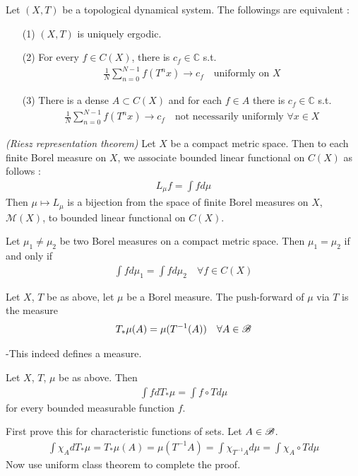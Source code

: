 \documentclass[10pt,a4paper]{report}
\newenvironment{proof}
{\begin{changemargin}{1cm}{0.5cm} 
	}%
	{\end{changemargin}
}
\begin{document}
\thm Let $(X,T)$ be a topological dynamical system. The followings are equivalent :
\begin{itemize}
\item[(1)] $(X,T)$ is uniquely ergodic.
\item[(2)] For every $f\in C(X)$, there is $c_f \in \mathbb{C}$ s.t. 
\begin{align*}
\frac{1}{N} \sum_{n=0}^{N-1} f(T^n x) \rightarrow c_f \quad \text{uniformly on } X
\end{align*}
\item[(3)]  There is a dense $A\subset C(X)$ and for each $f\in A$ there is $c_f \in \mathbb{C}$ s.t.
\begin{align*}
\frac{1}{N} \sum_{n=0}^{N-1} f(T^n x) \rightarrow c_f \quad \text{not necessarily uniformly } \forall x\in X
\end{align*}
\end{itemize}
\s

\thm \emph{(Riesz representation theorem)}  Let $X$ be a compact metric space. Then to each finite Borel measure on $X$, we associate bounded linear functional on $C(X)$ as follows : 
\begin{align*}
L_{\mu} f= \int f d\mu
\end{align*}
Then $\mu \mapsto L_{\mu}$ is a bijection from the space of finite Borel measures on $X$, $\mathscr{M}(X)$, to bounded linear functional on $C(X)$.
\s 

\cor Let $\mu_1 \neq \mu_2$ be two Borel measures on a compact metric space. Then $\mu_1 = \mu_2$ if and only if
\begin{align*}
\int f d\mu_1 = \int f d\mu_2 \quad \forall f \in C(X)
\end{align*}
\s

 Let $X$, $T$ be as above, let $\mu$ be a Borel measure. The push-forward of $\mu$ via $T$ is the measure
\begin{align*}
T_{*} \mu (A) = \mu(T^{-1}(A)) \quad \forall A\in \mathscr{B}
\end{align*}

-This indeed defines a measure.
\s

\lem Let $X$, $T$, $\mu$ be as above. Then
\begin{align*}
\int f dT_{*}\mu = \int f \circ T d\mu
\end{align*}
for every bounded measurable function $f$.
\begin{proof}
\pf First prove this for characteristic functions of sets. Let $A\in \mathscr{B}$.
\begin{align*}
\int \chi_A dT_* \mu = T_* \mu(A) = \mu(T^{-1} A) = \int \chi_{T^{-1} A } d\mu = \int \chi_A \circ T d\mu 
\end{align*}
Now use uniform class theorem to complete the proof.

\eop
\end{proof}
\s
\end{document}

